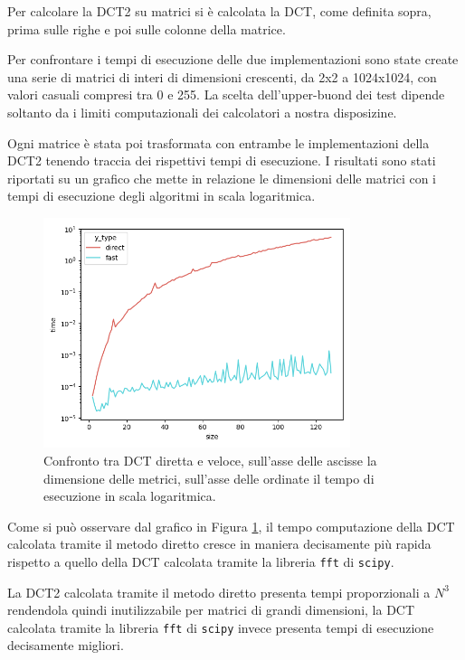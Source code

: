 \documentclass[a4paper, 12pt]{article}
\begin{document}
Per calcolare la DCT2 su matrici si è calcolata la DCT, come definita sopra, prima
sulle righe e poi sulle colonne della matrice.

Per confrontare i tempi di esecuzione delle due implementazioni sono state
create una serie di matrici di interi di dimensioni crescenti, da 2x2 a
1024x1024, con valori casuali compresi tra 0 e 255. La scelta dell'upper-buond
dei test dipende soltanto da i limiti computazionali dei calcolatori a nostra
disposizine.

Ogni matrice è stata poi trasformata con entrambe le implementazioni della DCT2
tenendo traccia dei rispettivi tempi di esecuzione. I risultati sono stati
riportati su un grafico che mette in relazione le dimensioni delle matrici con i
tempi di esecuzione degli algoritmi in scala logaritmica.

\begin{figure}[H]
	\centering
	\includegraphics[width=0.8\textwidth]{../test/benchmark-results/bench-incremental-0.png}
	\caption{Confronto tra DCT diretta e veloce, sull'asse delle ascisse la
		dimensione delle metrici, sull'asse delle ordinate il tempo di esecuzione in
		scala logaritmica.}
	\label{fig:incremental-benchmark}
\end{figure}

Come si può osservare dal grafico in Figura
\ref{fig:incremental-benchmark}, il tempo computazione della DCT calcolata
tramite il metodo diretto cresce in maniera decisamente più rapida rispetto a
quello della DCT calcolata tramite la libreria \texttt{fft} di \texttt{scipy}.

La DCT2 calcolata tramite il metodo diretto presenta tempi proporzionali a $N^3$
rendendola quindi inutilizzabile per matrici di grandi dimensioni, la DCT calcolata
tramite la libreria \texttt{fft} di \texttt{scipy} invece presenta tempi di esecuzione 
decisamente migliori.
\end{document}
